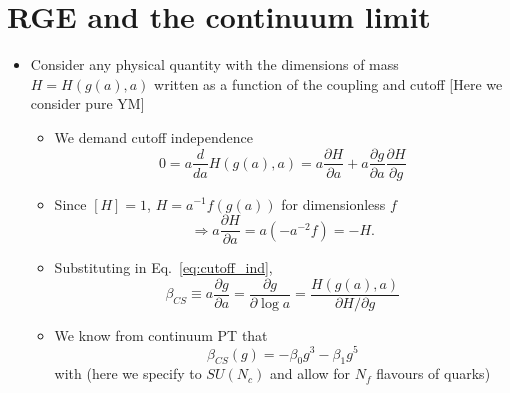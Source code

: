 \section{RGE and the continuum limit}

\begin{itemize}
  \item Consider any physical quantity with the dimensions of mass \(H=H(g(a), a)\) written as a function of the coupling and cutoff [Here we consider pure YM]
  \begin{itemize}
  \item We demand cutoff independence
  \begin{equation}
  \label{eq:cutoff_ind}
  0=a \frac{d}{d a} H(g(a), a)=a \frac{\partial H}{\partial a}+a \frac{\partial g}{\partial a} \frac{\partial H}{\partial g}
  \end{equation}
  \item Since $[H] = 1$, $H = a^{-1}f(g(a))$ for dimensionless $f$
  \begin{equation}
      \Rightarrow a \frac{\partial H}{\partial a} = a(- a^{-2}f) = - H.
  \end{equation}
  \item Substituting in Eq.~\eqref{eq:cutoff_ind},
  \begin{equation}
      \beta_{CS} \equiv a \frac{\partial g}{\partial a} = \frac{\partial g}{\partial \log a} = \frac{H(g(a),a)}{\partial H/\partial g}
  \end{equation}
  \item We know from continuum PT that
  \begin{equation}
      \beta_{CS}(g) = - \beta_0 g^3 - \beta_1 g^5
  \end{equation}
  with (here we specify to $SU(N_c)$ and allow for $N_f$ flavours of quarks)


\end{itemize}
\end{itemize}

